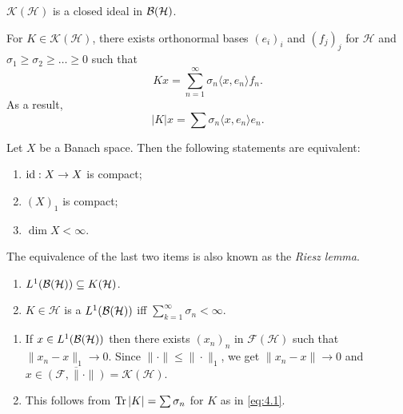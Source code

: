 \begin{remark}
  $\mathcal{K}(\mathcal{H})$ is a closed ideal in $\operatorname{\mathcal{B} (\mathcal{H})}$.
\end{remark}

\begin{theorem}
  For $K \in \mathcal{K} (\mathcal{H})$, there exists orthonormal bases $(e_i)_i$ and $(f_j)_j$ for $\mathcal{H}$
  and $\sigma_1 \geq \sigma_2 \geq \dots \geq 0$ such that 
  \begin{equation}\label{eq:4.1}
    K x = \sum_{n = 1} ^\infty \sigma_n \langle x, e_n \rangle f_n.
  \end{equation}
  As a result, $$|K| x = \sum \sigma_n \langle x, e_n \rangle e_n.$$  
\end{theorem}

\begin{proposition}
  Let $X$ be a Banach space. Then the following statements are equivalent:
  \begin{enumerate}
    \item $\operatorname{id}: X \to X$ is compact;
    \item $(X)_1$ is compact;
    \item $\dim X < \infty$.
  \end{enumerate}
  The equivalence of the last two items is also known as the \emph{Riesz lemma}.
\end{proposition}

\begin{theorem}
  \begin{enumerate}
    \item $L^1 (\operatorname{\mathcal{B} (\mathcal{H})}) \subseteq K(\mathcal{H})$.
    \item $K \in \mathcal{H}$ is a $L^1 (\operatorname{\mathcal{B} (\mathcal{H})})$ iff $\sum_{k = 1} ^\infty \sigma_n < \infty$.
  \end{enumerate}
\end{theorem}

\begin{myproof}
  \begin{enumerate}
    \item If $x \in L^1 (\operatorname{\mathcal{B} (\mathcal{H})})$ then there exists $(x_n)_n$ in $\mathcal{F} (\mathcal{H})$ such that $\|x_n - x\|_1 \to 0$.
    Since $\| \cdot \| \leq \| \cdot \|_1$, we get $\|x_n - x \| \to 0$ and $x \in \overline{(\mathcal{F}, \| \cdot\|)} = \mathcal{K} (\mathcal{H})$.
    \item This follows from $\operatorname{Tr} |K| = \sum \sigma_n$ for $K$ as in \eqref{eq:4.1}. \qedhere
  \end{enumerate}
\end{myproof}


